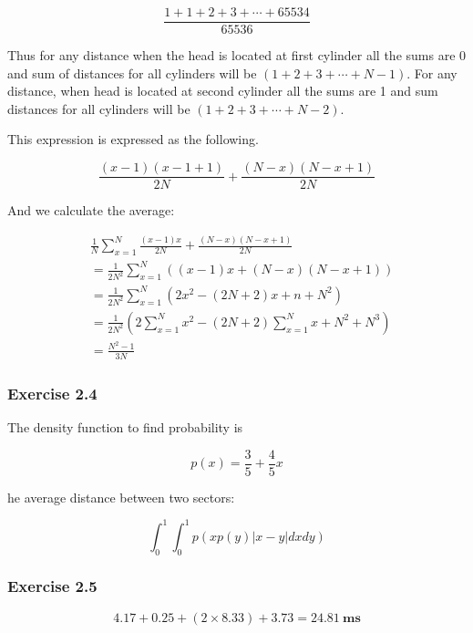 \documentclass[../../main.tex]{subfiles}
\begin{document}
$$
\frac{1 + 1 + 2 + 3  + \cdots + 65534}{65536}
$$

Thus for any distance when the head is located at first cylinder all
the sums are 0 and sum of distances for all cylinders will be
$(1 + 2 + 3 + \cdots + N - 1)$. For any distance, when head is
located at second cylinder all the sums are 1 and sum distances
for all cylinders will be $(1 + 2 + 3 + \cdots + N - 2)$.

This expression is expressed as the following.

$$
\frac{(x - 1)(x - 1 + 1)}{2N} + \frac{(N - x)(N - x + 1)}{2N}
$$

And we calculate the average:

\begin{align*}
  &\frac{1}{N}\sum_{x = 1}^{N}\frac{(x - 1)x}{2N} + \frac{(N - x)(N - x + 1)}{2N} \\
  &=\frac{1}{2N^2}\sum_{x = 1}^{N}((x-1)x + (N - x)(N - x + 1)) \\
  &=\frac{1}{2N^2}\sum_{x = 1}^{N}(2x^2 - (2N+2)x + n + N^2) \\
  &=\frac{1}{2N^2}(2\sum_{x = 1}^{N}x^2 - (2N+2)\sum_{x = 1}^{N}x + N^2 + N^3) \\
  &=\frac{N^2 - 1}{3N}
\end{align*}

\subsubsection*{Exercise 2.4}

The density function to find probability is

$$
p(x) = \frac{3}{5} + \frac{4}{5}x
$$

he average distance between two sectors:

$$
\int_0^1 \int_0^1 p(xp(y)|x-y|dxdy)
$$

\subsubsection*{Exercise 2.5}

$$
4.17 + 0.25 + (2 \times 8.33) + 3.73= 24.81 \ \mathbf{ms}
$$
\end{document}
